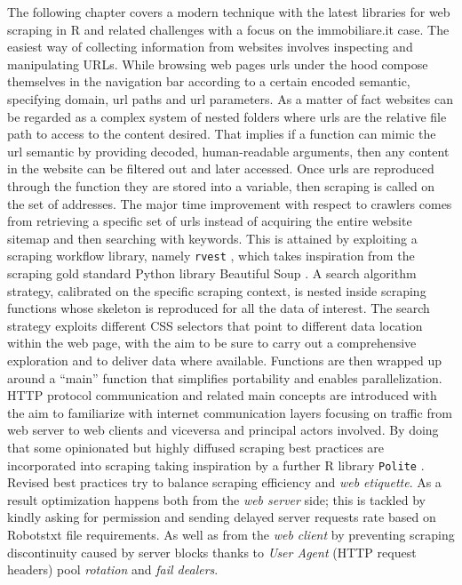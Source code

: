 \documentclass[
  12pt,
  a4paper,
  oneside]{book}
\newcommand{\passthrough}[1]{#1}
\theoremstyle{definition}
\theoremstyle{definition}
\theoremstyle{definition}
\theoremstyle{remark}
\begin{document}
The following chapter covers a modern technique with the latest libraries for web scraping in R and related challenges with a focus on the immobiliare.it case. The easiest way of collecting information from websites involves inspecting and manipulating URLs. While browsing web pages urls under the hood compose themselves in the navigation bar according to a certain encoded semantic, specifying domain, url paths and url parameters. As a matter of fact websites can be regarded as a complex system of nested folders where urls are the relative file path to access to the content desired. That implies if a function can mimic the url semantic by providing decoded, human-readable arguments, then any content in the website can be filtered out and later accessed.
Once urls are reproduced through the function they are stored into a variable, then scraping is called on the set of addresses.
The major time improvement with respect to crawlers comes from retrieving a specific set of urls instead of acquiring the entire website sitemap and then searching with keywords.
This is attained by exploiting a scraping workflow library, namely \passthrough{\lstinline!rvest!} \citet{rvest}, which takes inspiration from the scraping gold standard Python library Beautiful Soup \citet{Beautifulsoup}. A search algorithm strategy, calibrated on the specific scraping context, is nested inside scraping functions whose skeleton is reproduced for all the data of interest. The search strategy exploits different CSS selectors that point to different data location within the web page, with the aim to be sure to carry out a comprehensive exploration and to deliver data where available. Functions are then wrapped up around a ``main'' function that simplifies portability and enables parallelization.
HTTP protocol communication and related main concepts are introduced with the aim to familiarize with internet communication layers focusing on traffic from web server to web clients and viceversa and principal actors involved.
By doing that some opinionated but highly diffused scraping best practices are incorporated into scraping taking inspiration by a further R library \passthrough{\lstinline!Polite!} \citet{polite}. Revised best practices try to balance scraping efficiency and \emph{web etiquette}. As a result optimization happens both from the \emph{web server} side; this is tackled by kindly asking for permission and sending delayed server requests rate based on Robotstxt file requirements. As well as from the \emph{web client} by preventing scraping discontinuity caused by server blocks thanks to \emph{User Agent} (HTTP request headers) pool \emph{rotation} and \emph{fail dealers}.
\end{document}

